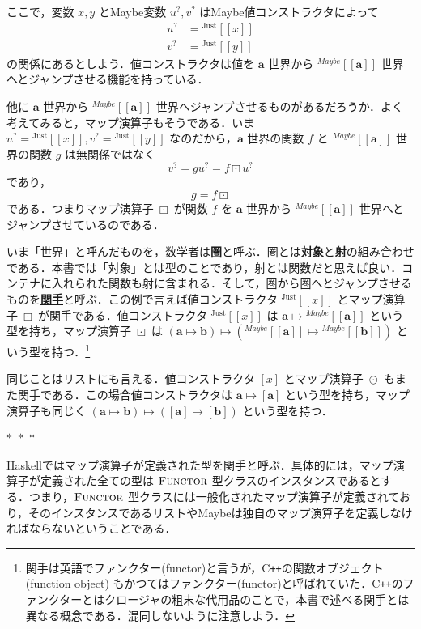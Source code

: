 \documentclass[a4paper,twocolumn]{jsbook}
\def\[{\left[\!\left[}
\def\]{\right]\!\right]}
\newcommand{\separator}{\begin{center}$*$~$*$~$*$\end{center}}
\newcommand{\programminglanguage}[1]{\textsf{#1}}
\newcommand{\cxx}{\programminglanguage{C}\texttt{++}}
\newcommand{\haskell}{\programminglanguage{Haskell}}
\newcommand{\keyword}[1]{{\underline{\textbf{#1}}}}
\DeclareMathOperator{\mMapList}{\odot}
\DeclareMathOperator{\mMapMaybe}{\boxdot}
\DeclareMathOperator{\mMapsTo}{\mapsto}
\newcommand{\mType}[1]{\mathbf{#1}}
\newcommand{\mListType}[1]{[\mType{#1}]}
\newcommand{\mTypeConstructor}[1]{\textit{#1}}
\newcommand{\mGenericTypeAssemble}[2]{{}^{\mTypeConstructor{#1}}\[\mType{#2}\]}
\newcommand{\mMaybeType}[1]{\mGenericTypeAssemble{Maybe}{#1}}
\newcommand{\mGenericValueConstructor}[1]{\mathrm{#1}}
\newcommand{\mGenericWith}[2]{{}^\mGenericValueConstructor{#1}\[#2\]}
\newcommand{\mJustWith}[1]{\mGenericWith{Just}{#1}}
\newcommand{\mListWith}[1]{\left[#1\right]}
\newcommand{\mGenericTypeClass}[1]{\textsc{#1}} %
\newcommand{\mFunctorTypeClass}{\mGenericTypeClass{Functor}}
\newcommand{\mMaybe}[1]{{#1}^?}
\newcommand{\mProj}[2]{#1\mMapsTo#2}
\begin{document}
ここで，変数 $x,y$ とMaybe変数 $\mMaybe{u},\mMaybe{v}$ はMaybe値コンストラクタによって
\begin{align}
\mMaybe{u}&=\mJustWith{x}\\
\mMaybe{v}&=\mJustWith{y}
\end{align}
の関係にあるとしよう．値コンストラクタは値を $\mType{a}$ 世界から $\mMaybeType{a}$ 世界へとジャンプさせる機能を持っている．

他に $\mType{a}$ 世界から $\mMaybeType{a}$ 世界へジャンプさせるものがあるだろうか．よく考えてみると，マップ演算子もそうである．いま $\mMaybe{u}=\mJustWith{x},\mMaybe{v}=\mJustWith{y}$ なのだから，$\mType{a}$ 世界の関数 $f$ と $\mMaybeType{a}$ 世界の関数 $g$ は無関係ではなく
\begin{equation}
\mMaybe{v}=g\mMaybe{u}=f\mMapMaybe\mMaybe{u}
\end{equation}
であり，
\begin{equation}
g=f\mMapMaybe
\end{equation}
である．つまりマップ演算子 $\mMapMaybe$ が関数 $f$ を $\mType{a}$ 世界から $\mMaybeType{a}$ 世界へとジャンプさせているのである．

いま「世界」と呼んだものを，数学者は\keyword{圏}と呼ぶ．圏とは\keyword{対象}と\keyword{射}の組み合わせである．本書では「対象」とは型のことであり，射とは関数だと思えば良い．コンテナに入れられた関数も射に含まれる．そして，圏から圏へとジャンプさせるものを\keyword{関手}と呼ぶ．この例で言えば値コンストラクタ $\mJustWith{x}$ とマップ演算子 $\mMapMaybe$ が関手である．値コンストラクタ $\mJustWith{x}$ は $\mProj{\mType{a}}{\mMaybeType{a}}$ という型を持ち，マップ演算子 $\mMapMaybe$ は $\mProj{(\mProj{\mType{a}}{\mType{b}})}{(\mProj{\mMaybeType{a}}{\mMaybeType{b}})}$ という型を持つ．\footnote{関手は英語でファンクター(functor)と言うが，\cxx の関数オブジェクト (function object) もかつてはファンクター(functor)と呼ばれていた．\cxx のファンクターとはクロージャの粗末な代用品のことで，本書で述べる関手とは異なる概念である．混同しないように注意しよう．}

同じことはリストにも言える．値コンストラクタ $\mListWith{x}$ とマップ演算子 $\mMapList$ もまた関手である．この場合値コンストラクタは $\mProj{\mType{a}}{\mListType{a}}$ という型を持ち，マップ演算子も同じく $\mProj{(\mProj{\mType{a}}{\mType{b}})}{(\mProj{\mListType{a}}{\mListType{b}})}$ という型を持つ．

\separator

\haskell ではマップ演算子が定義された型を関手と呼ぶ．具体的には，マップ演算子が定義された全ての型は $\mFunctorTypeClass$ 型クラスのインスタンスであるとする．つまり，$\mFunctorTypeClass$ 型クラスには一般化されたマップ演算子が定義されており，そのインスタンスであるリストやMaybeは独自のマップ演算子を定義しなければならないということである．
\end{document}
